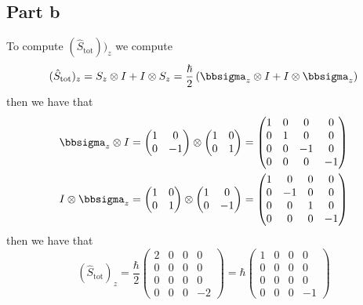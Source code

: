 \documentclass[12pt]{report}
\theoremstyle{custom}
\begin{document}
\subsection*{Part b}
To compute $(\hat{S}_{\text{tot}}))_z$ we compute 
\begin{equation*}
(\hat{S}_{\text{tot}})_z = S_z \otimes I + I \otimes S_z = \frac{\hbar}{2} \left(\bbsigma_z \otimes I + I \otimes \bbsigma_z\right)
\end{equation*}
then we have that
\begin{align*}
\bbsigma_z \otimes I &= \begin{pmatrix} 1 & 0 \\ 0 & -1 \end{pmatrix} \otimes \begin{pmatrix} 1 & 0 \\ 0 & 1 \end{pmatrix} = \begin{pmatrix} 1 & 0 & 0 & 0 \\ 0 & 1 & 0 & 0 \\ 0 & 0 & -1 & 0 \\ 0 & 0 & 0 & -1 \end{pmatrix} \\
I \otimes \bbsigma_z &= \begin{pmatrix} 1 & 0 \\ 0 & 1 \end{pmatrix} \otimes \begin{pmatrix} 1 & 0 \\ 0 & -1 \end{pmatrix} = \begin{pmatrix} 1 & 0 & 0 & 0 \\ 0 & -1 & 0 & 0 \\ 0 & 0 & 1 & 0 \\ 0 & 0 & 0 & -1 \end{pmatrix}
\end{align*}
then we have that
\begin{equation*}
  (\hat{S}_{\text{tot}})_z = \frac{\hbar}{2} \begin{pmatrix} 2 & 0 & 0 & 0 \\ 0 & 0 & 0 & 0 \\ 0 & 0 & 0 & 0 \\ 0 & 0 & 0 & -2 \end{pmatrix} = \hbar \begin{pmatrix} 1 & 0 & 0 & 0 \\ 0 & 0 & 0 & 0 \\ 0 & 0 & 0 & 0 \\ 0 & 0 & 0 & -1 \end{pmatrix}
\end{equation*}
\end{document}
